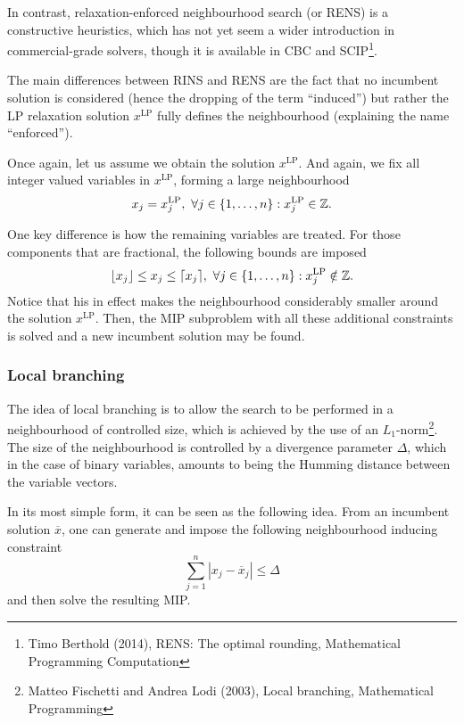 In contrast, relaxation-enforced neighbourhood search (or RENS) is a constructive heuristics, which has not yet seem a wider introduction in commercial-grade solvers, though it is available in   CBC and SCIP\footnote{Timo Berthold (2014), RENS: The optimal rounding, Mathematical Programming Computation}.
 
The main differences between RINS and RENS are the fact that no incumbent solution is considered (hence the dropping of the term ``induced'') but rather the LP relaxation solution $x^{\text{LP}}$ fully defines the neighbourhood (explaining the name ``enforced'').
 
Once again, let us assume we obtain the solution $x^{\text{LP}}$. And again, we fix all integer valued variables in $x^{\text{LP}}$, forming a large neighbourhood
%
\begin{equation*}
	x_j = x_j^{\text{LP}}, \ \forall j \in \left\{ 1,\dots,n \right \} : x_j^{\text{LP}} \in \mathbb{Z}.
\end{equation*}
%

One key difference is how the remaining variables are treated. For those components that are fractional, the following bounds are imposed
%
\begin{equation*}
	\lfloor x_j \rfloor \leq x_j \leq \lceil x_j \rceil, \ \forall j \in \left\{ 1,\dots,n \right \} : x_j^{\text{LP}} \notin \mathbb{Z}.
\end{equation*}
%
Notice that his in effect makes the neighbourhood considerably smaller around the solution $x^{\text{LP}}$. Then, the MIP subproblem with all these additional constraints is solved and a new incumbent solution may be found. 

 
\subsubsection{Local branching}

The idea of local branching is to allow the search to be performed in a neighbourhood of controlled size, which is achieved by the use of an $L_1$-norm\footnote{Matteo Fischetti and Andrea Lodi (2003), Local branching, Mathematical Programming}. The size of the neighbourhood is controlled by a divergence parameter $\Delta$, which in the case of binary variables, amounts to being the Humming distance between the variable vectors. 

In its most simple form, it can be seen as the following idea. From an incumbent solution $\overline{x}$, one can generate and impose the following neighbourhood inducing constraint
%
\begin{equation*}
	\sum_{j=1}^n | x_j - \overline{x}_j | \leq \Delta
\end{equation*}
%
and then solve the resulting MIP. 

